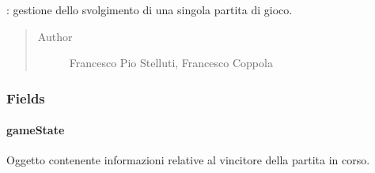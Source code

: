 \documentclass[letterpaper,10pt,italian,openany,oneside]{sphinxmanual}
\begin{document}
\begin{fulllineitems}
\label{\detokenize{source/it/unicam/cs/pa/mastermind/gamecore/SingleMatch:it.unicam.cs.pa.mastermind.gamecore.SingleMatch}}
: gestione dello svolgimento di una singola partita di gioco.
\begin{quote}\begin{description}
\item[{Author}] \leavevmode
Francesco Pio Stelluti, Francesco Coppola

\end{description}\end{quote}

\end{fulllineitems}



\subsubsection{Fields}
\label{\detokenize{source/it/unicam/cs/pa/mastermind/gamecore/SingleMatch:fields}}

\paragraph{gameState}
\label{\detokenize{source/it/unicam/cs/pa/mastermind/gamecore/SingleMatch:gamestate}}

\begin{fulllineitems}
\label{\detokenize{source/it/unicam/cs/pa/mastermind/gamecore/SingleMatch:it.unicam.cs.pa.mastermind.gamecore.SingleMatch.gameState}}
Oggetto contenente informazioni relative al vincitore della partita in corso.

\end{fulllineitems}
\end{document}
